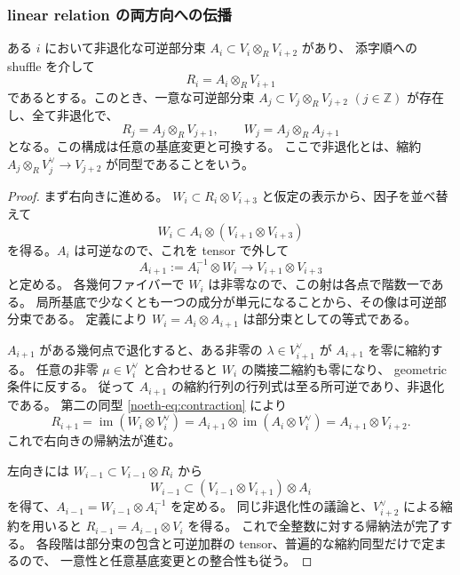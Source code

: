 \subsubsection{linear relation の両方向への伝播}

\begin{lemma}[一つの線型関係からの伝播]
\label{lem:linear-propagation-without-period}
ある $i$ において非退化な可逆部分束
$A_i\subset V_i\otimes_R V_{i+2}$ があり、
添字順への shuffle を介して
\[
 R_i=A_i\otimes_R V_{i+1}
\]
であるとする。このとき、一意な可逆部分束
$A_j\subset V_j\otimes_R V_{j+2}$ $(j\in\mathbb Z)$ が存在し、全て非退化で、
\begin{equation}\label{eq:linear-all-relations}
 R_j=A_j\otimes_R V_{j+1},\qquad
 W_j=A_j\otimes_R A_{j+1}
\end{equation}
となる。この構成は任意の基底変更と可換する。
ここで非退化とは、縮約
$A_j\otimes_R V_j^\vee\to V_{j+2}$ が同型であることをいう。
\end{lemma}

\begin{proof}
まず右向きに進める。
$W_i\subset R_i\otimes V_{i+3}$ と仮定の表示から、因子を並べ替えて
\[
 W_i\subset A_i\otimes(V_{i+1}\otimes V_{i+3})
\]
を得る。$A_i$ は可逆なので、これを tensor で外して
\[
 A_{i+1}:=A_i^{-1}\otimes W_i
       \longrightarrow V_{i+1}\otimes V_{i+3}
\]
と定める。
各幾何ファイバーで $W_i$ は非零なので、この射は各点で階数一である。
局所基底で少なくとも一つの成分が単元になることから、その像は可逆部分束である。
定義により $W_i=A_i\otimes A_{i+1}$ は部分束としての等式である。

$A_{i+1}$ がある幾何点で退化すると、ある非零の
$\lambda\in V_{i+1}^\vee$ が $A_{i+1}$ を零に縮約する。
任意の非零 $\mu\in V_i^\vee$ と合わせると $W_i$ の隣接二縮約も零になり、
geometric 条件に反する。
従って $A_{i+1}$ の縮約行列の行列式は至る所可逆であり、非退化である。
第二の同型 \eqref{noeth-eq:contraction} により
\[
 R_{i+1}
   =\operatorname{im}(W_i\otimes V_i^\vee)
   =A_{i+1}\otimes\operatorname{im}(A_i\otimes V_i^\vee)
   =A_{i+1}\otimes V_{i+2}.
\]
これで右向きの帰納法が進む。

左向きには $W_{i-1}\subset V_{i-1}\otimes R_i$ から
\[
 W_{i-1}\subset(V_{i-1}\otimes V_{i+1})\otimes A_i
\]
を得て、$A_{i-1}=W_{i-1}\otimes A_i^{-1}$ を定める。
同じ非退化性の議論と、$V_{i+2}^\vee$ による縮約を用いると
$R_{i-1}=A_{i-1}\otimes V_i$ を得る。
これで全整数に対する帰納法が完了する。
各段階は部分束の包含と可逆加群の tensor、普遍的な縮約同型だけで定まるので、
一意性と任意基底変更との整合性も従う。
\end{proof}

